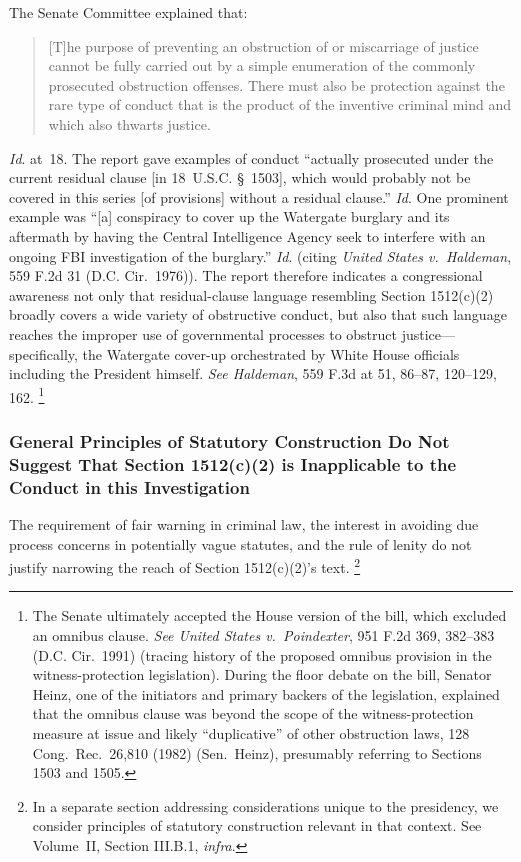 The Senate Committee explained that:

\begin{quote}
[T]he purpose of preventing an obstruction of or miscarriage of justice cannot be fully carried out by a simple enumeration of the commonly prosecuted obstruction offenses.
There must also be protection against the rare type of conduct that is the product of the inventive criminal mind and which also thwarts justice.
\end{quote}

\textit{Id}. at~18.
The report gave examples of conduct ``actually prosecuted under the current residual clause [in 18~U.S.C. \S~1503], which would probably not be covered in this series [of provisions] without a residual clause.''
\textit{Id}.
One prominent example was ``[a] conspiracy to cover up the Watergate burglary and its aftermath by having the Central Intelligence Agency seek to interfere with an ongoing FBI investigation of the burglary.''
\textit{Id}. (citing \textit{United States v.\ Haldeman}, 559 F.2d 31 (D.C. Cir.~1976)).
The report therefore indicates a congressional awareness not only that residual-clause language resembling Section 1512(c)(2) broadly covers a wide variety of obstructive conduct, but also that such language reaches the improper use of governmental processes to obstruct justice---specifically, the Watergate cover-up orchestrated by White House officials including the President himself.
\textit{See Haldeman}, 559 F.3d at 51, 86--87, 120--129, 162.%
\footnote{The Senate ultimately accepted the House version of the bill, which excluded an omnibus clause.
\textit{See United States v.\ Poindexter}, 951 F.2d 369, 382--383 (D.C. Cir.~1991) (tracing history of the proposed omnibus provision in the witness-protection legislation).
During the floor debate on the bill, Senator Heinz, one of the initiators and primary backers of the legislation, explained that the omnibus clause was beyond the scope of the witness-protection measure at issue and likely ``duplicative'' of other obstruction laws, 128 Cong.\ Rec.\ 26,810 (1982) (Sen.~Heinz), presumably referring to Sections 1503 and 1505.}

\subsubsection{General Principles of Statutory Construction Do Not Suggest That Section 1512(c)(2) is Inapplicable to the Conduct in this Investigation}

The requirement of fair warning in criminal law, the interest in avoiding due process concerns in potentially vague statutes, and the rule of lenity do not justify narrowing the reach of Section 1512(c)(2)'s text.%
\footnote{In a separate section addressing considerations unique to the presidency, we consider principles of statutory construction relevant in that context.
See Volume~II, Section III.B.1, \textit{infra}.}

